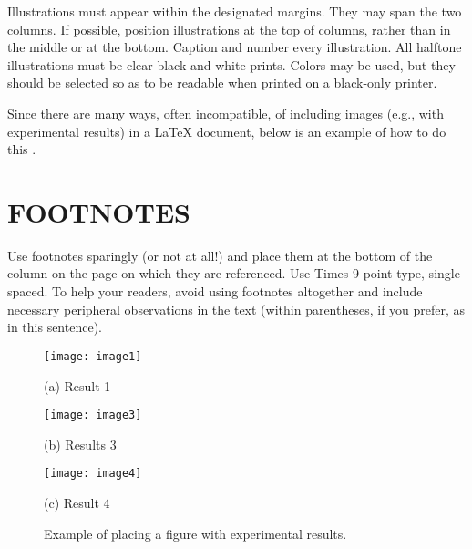 \documentclass{article}
\begin{document}
Illustrations must appear within the designated margins.  They may span the two
columns.  If possible, position illustrations at the top of columns, rather
than in the middle or at the bottom.  Caption and number every illustration.
All halftone illustrations must be clear black and white prints.  Colors may be
used, but they should be selected so as to be readable when printed on a
black-only printer.

Since there are many ways, often incompatible, of including images (e.g., with
experimental results) in a LaTeX document, below is an example of how to do
this \cite{Lamp86}.

\section{FOOTNOTES}
\label{sec:foot}

Use footnotes sparingly (or not at all!) and place them at the bottom of the
column on the page on which they are referenced. Use Times 9-point type,
single-spaced. To help your readers, avoid using footnotes altogether and
include necessary peripheral observations in the text (within parentheses, if
you prefer, as in this sentence).

\begin{figure}[htb]

\begin{minipage}[b]{1.0\linewidth}
  \centering
  \centerline{\texttt{[image: image1]}}
  \centerline{(a) Result 1}\medskip
\end{minipage}
%
\begin{minipage}[b]{.48\linewidth}
  \centering
  \centerline{\texttt{[image: image3]}}
  \centerline{(b) Results 3}\medskip
\end{minipage}
\hfill
\begin{minipage}[b]{0.48\linewidth}
  \centering
  \centerline{\texttt{[image: image4]}}
  \centerline{(c) Result 4}\medskip
\end{minipage}
%
\caption{Example of placing a figure with experimental results.}
\label{fig:res}
%
\end{figure}
\end{document}
